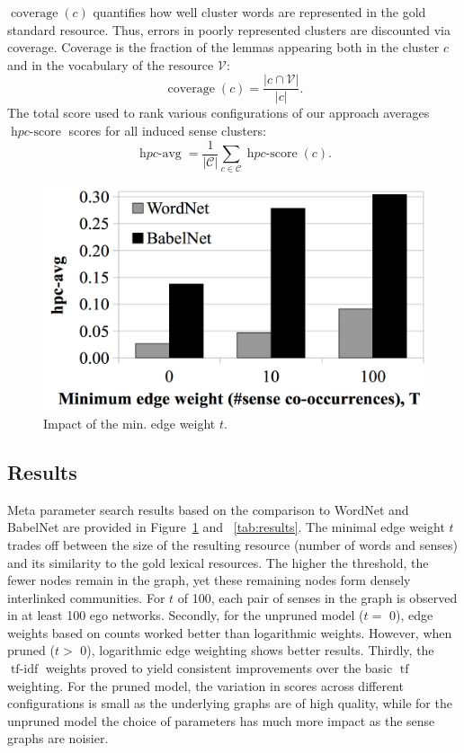 \documentclass[10pt, a4paper]{article}
\DeclareMathOperator{\tf}{tf}
\DeclareMathOperator{\tfidf}{tf-idf}
\DeclareMathOperator{\coverage}{coverage}
\DeclareMathOperator{\hpcscore}{\mathit{hpc}-score}
\DeclareMathOperator{\hpcavg}{\mathit{hpc}-avg}
\begin{document}
$\coverage(c)$ quantifies how well cluster words are represented in the gold standard resource. Thus, errors in poorly represented clusters are discounted via coverage. Coverage is the fraction of the lemmas appearing both in the cluster $c$ and in the vocabulary of the resource $\mathcal{V}$:
%
\begin{equation}
 \coverage(c) = \frac{\left\vert{}c \cap \mathcal{V}\right\vert}{\left\vert{}c\right\vert}.
\end{equation}
%
The total score used to rank various configurations of our approach averages $\hpcscore$ scores for all induced sense clusters:
%
\begin{equation}
  \hpcavg = \frac{1}{\left\vert{}\mathcal{C}\right\vert} \sum_{c \in \mathcal{C}} \hpcscore(c)\text{.}
\end{equation}

\begin{figure}
  \centering
  \includegraphics[width=.4\textwidth]{figures/t}
  \caption{Impact of the min. edge weight $t$. }
  \label{fig:threshold}
\end{figure}

\subsection{Results}

Meta parameter search results based on the comparison to WordNet and BabelNet are provided in Figure~\ref{fig:threshold} and \tablename~\ref{tab:results}. The minimal edge weight $t$ trades off between the size of the resulting resource (number of words and senses) and its similarity to the gold lexical resources. The higher the threshold, the fewer nodes remain in the graph, yet these remaining nodes form densely interlinked communities. For $t$ of 100, each pair of senses in the graph is observed in at least 100 ego networks. Secondly, for the unpruned model ($t=$ 0), edge weights based on counts worked better than logarithmic weights. However, when pruned ($t >$ 0), logarithmic edge weighting shows better results. Thirdly, the $\tfidf$ weights proved to yield consistent improvements over the basic $\tf$ weighting. For the pruned model, the variation in scores across different configurations is small as the underlying graphs are of high quality, while for the unpruned model the choice of parameters has much more impact as the sense graphs are noisier.  
\end{document}
